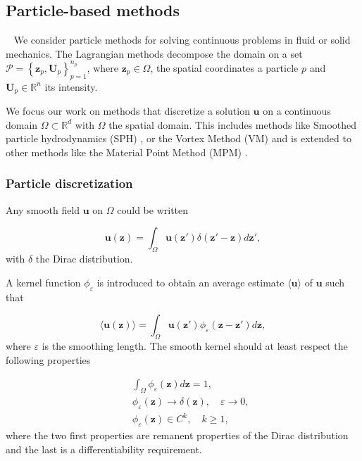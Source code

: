 
\subsection{Particle-based methods}~\label{Background_Part}
We consider particle methods for solving continuous problems in fluid or solid mechanics. The Lagrangian methods decompose the domain on a set $\mathcal P = \left\{\bm z_p, \bm U_p\right\}_{p = 1}^{n_p}$, where $\bm z_p \in \Omega$, the spatial coordinates a particle $p$ and $\bm U_p \in \mathbb{R}^n$ its intensity.


We focus our work on methods that discretize a solution $\bm u$ on a continuous domain $\Omega \subset \mathbb{R}^d$ with $\Omega$ the spatial domain. This includes methods like Smoothed particle hydrodynamics (SPH) \cite{gingold_monaghan_sph_1977,lucy_1977}, or the Vortex Method (VM) \cite{cottet_vortex_2000} and is extended to other methods like the Material Point Method (MPM) \cite{sulsky_particle_1994}.

\subsubsection{Particle discretization}

Any smooth field $\bm u$ on $\Omega$ could be written

\begin{equation*}
	\bm u(\bm z) = \int_{\Omega} \bm u(\bm z') \delta(\bm z' - \bm z)  d\bm z',
\end{equation*}with $\delta$ the Dirac distribution.

A kernel function $\phi_\varepsilon$ is introduced to obtain an average estimate $\langle \bm u \rangle$ of $\bm u$ such that

\begin{equation*}
	\langle \bm u(\bm z) \rangle = \int_{\Omega} \bm u(\bm z') \phi_\varepsilon(\bm z-\bm z') d\bm z,
\end{equation*}where $\varepsilon$ is the smoothing length. The smooth kernel should at least respect the following properties

\begin{eqnarray*}
	&& \int_{\Omega} \phi_\varepsilon(\bm z) d\bm z = 1,      \\
	&& \phi_\varepsilon(\bm z) \to \delta(\bm z), \quad \varepsilon \to 0, \\
	&& \phi_\varepsilon(\bm z) \in C^k,  \quad k \geq 1,
\end{eqnarray*} where the two first properties are remanent properties of the Dirac distribution and the last is a differentiability requirement.

